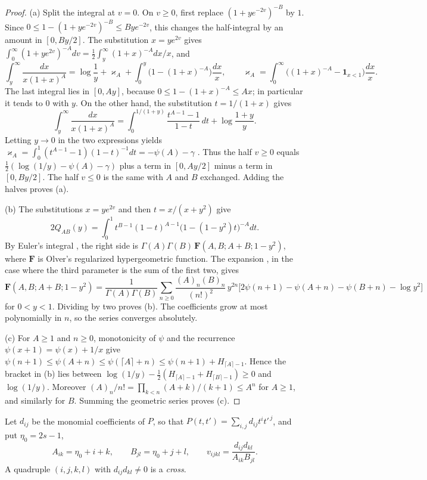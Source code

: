 \begin{proof}
(a) Split the integral at $v=0$. On $v\ge0$, first replace
$(1+ye^{-2v})^{-B}$ by $1$. Since
$0\le1-(1+ye^{-2v})^{-B}\le Bye^{-2v}$, this changes the half-integral
by an amount in $[0,By/2]$. The substitution $x=ye^{2v}$ gives
$\int_0^\infty(1+ye^{2v})^{-A}dv=\frac12\int_y^\infty(1+x)^{-A}dx/x$,
and
\[
 \int_y^\infty\frac{dx}{x(1+x)^A}
 =\log\frac1y+\varkappa_A+\int_0^y\bigl(1-(1+x)^{-A}\bigr)\frac{dx}x,\qquad
 \varkappa_A=\int_0^\infty\bigl((1+x)^{-A}-\mathbf 1_{x<1}\bigr)\frac{dx}x .
\]
The last integral lies in $[0,Ay]$, because $0\le1-(1+x)^{-A}\le Ax$;
in particular it tends to $0$ with $y$. On the other hand, the
substitution $t=1/(1+x)$ gives
\[
 \int_y^\infty\frac{dx}{x(1+x)^A}
 =\int_0^{1/(1+y)}\frac{t^{A-1}-1}{1-t}\,dt+\log\frac{1+y}y .
\]
Letting $y\to0$ in the two expressions yields
$\varkappa_A=\int_0^1(t^{A-1}-1)(1-t)^{-1}dt=-\psi(A)-\gamma$
\cite[Equation~(5.9.16)]{DLMF}. Thus the half $v\ge0$ equals
$\frac12(\log(1/y)-\psi(A)-\gamma)$ plus a term in $[0,Ay/2]$ minus a
term in $[0,By/2]$. The half $v\le0$ is the same with $A$ and $B$
exchanged. Adding the halves proves (a).

(b) The substitutions $x=ye^{2v}$ and then $t=x/(x+y^2)$ give
\[
 2Q_{AB}(y)=\int_0^1t^{B-1}(1-t)^{A-1}\bigl(1-(1-y^2)t\bigr)^{-A}dt .
\]
By Euler's integral \cite[Equation~(15.6.1)]{DLMF}, the right side is
$\Gamma(A)\Gamma(B)\,\mathbf F(A,B;A+B;1-y^2)$, where $\mathbf F$ is
Olver's regularized hypergeometric function. The expansion
\cite[Equation~(15.8.10)]{DLMF}, in the case where the third parameter
is the sum of the first two, gives
\[
 \mathbf F(A,B;A+B;1-y^2)=\frac1{\Gamma(A)\Gamma(B)}\sum_{n\ge0}
 \frac{(A)_n(B)_n}{(n!)^2}\,y^{2n}\bigl[2\psi(n+1)-\psi(A+n)-\psi(B+n)
 -\log y^2\bigr]
\]
for $0<y<1$. Dividing by two proves (b). The coefficients grow at most
polynomially in $n$, so the series converges absolutely.

(c) For $A\ge1$ and $n\ge0$, monotonicity of $\psi$ and the recurrence
$\psi(x+1)=\psi(x)+1/x$ give
$\psi(n+1)\le\psi(A+n)\le\psi(\lceil A\rceil+n)\le\psi(n+1)+H_{\lceil
A\rceil-1}$. Hence the bracket in (b) lies between
$\log(1/y)-\frac12(H_{\lceil A\rceil-1}+H_{\lceil B\rceil-1})\ge0$ and
$\log(1/y)$. Moreover $(A)_n/n!=\prod_{k<n}(A+k)/(k+1)\le A^n$ for
$A\ge1$, and similarly for $B$. Summing the geometric series proves
(c).
\end{proof}

\begin{definition}\label{pf:cross}
Let $d_{ij}$ be the monomial coefficients of $P$, so that
$P(t,t')=\sum_{i,j}d_{ij}t^it'^{\,j}$, and put $\eta_0=2s-1$,
\[
 A_{ik}=\eta_0+i+k,\qquad B_{jl}=\eta_0+j+l,\qquad
 v_{ijkl}=\frac{d_{ij}d_{kl}}{A_{ik}B_{jl}} .
\]
A quadruple $(i,j,k,l)$ with $d_{ij}d_{kl}\ne0$ is a \emph{cross}.
\end{definition}

